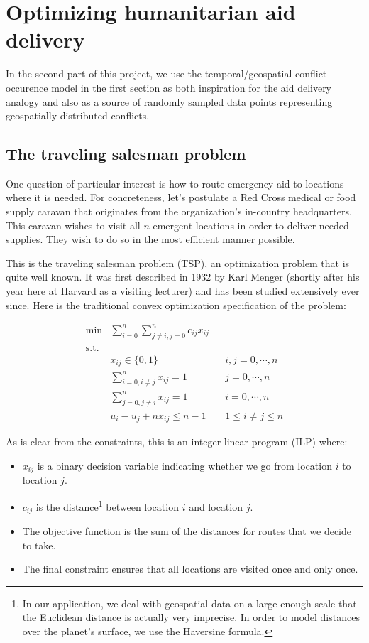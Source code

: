 \documentclass{article} %
\begin{document}
\section{Optimizing humanitarian aid delivery}

In the second part of this project, we use the temporal/geospatial conflict occurence model in the first section as both inspiration for the aid delivery analogy and also as a source of randomly sampled data points representing geospatially distributed conflicts.

\subsection{The traveling salesman problem}

One question of particular interest is how to route emergency aid
to locations where it is needed.  For concreteness, let's postulate a Red Cross medical or food supply caravan that originates from the organization's in-country headquarters. This caravan wishes to visit all $n$ emergent locations in order to
deliver needed supplies. They wish to do so in the most efficient manner possible.

This is the traveling salesman problem (TSP), an optimization problem that is quite well known. It was first described in 1932 by Karl Menger (shortly after his year here at Harvard as a visiting lecturer) and has been studied extensively ever since.\cite{Menger} Here is the traditional convex optimization specification of the problem:\cite{Winston}


\begin{align*}
\min &\sum_{i=0}^n \sum_{j\ne i,j=0}^nc_{ij}x_{ij} &&  \\
\mathrm{s.t.} & \\
	& x_{ij} \in \{0, 1\} && i,j=0, \cdots, n \\
	& \sum_{i=0,i\ne j}^n x_{ij} = 1 && j=0, \cdots, n \\
	& \sum_{j=0,j\ne i}^n x_{ij} = 1 && i=0, \cdots, n \\
	&u_i-u_j +nx_{ij} \le n-1 && 1 \le i \ne j \le n
\end{align*}

As is clear from the constraints, this is an integer linear program (ILP) where:

\begin{itemize}
  \item $x_{ij}$ is a binary decision variable indicating whether we go from location $i$ to location $j$.
  \item $c_{ij}$ is the distance\footnote{In our application, we deal with geospatial data on a large enough scale that the Euclidean distance is actually very imprecise. In order to model distances over the planet's surface, we use the Haversine formula.} between location $i$ and location $j$.
  \item The objective function is the sum of the distances for routes that we decide to take.
  \item The final constraint ensures that all locations are visited once and only once.
\end{itemize}
\end{document}
